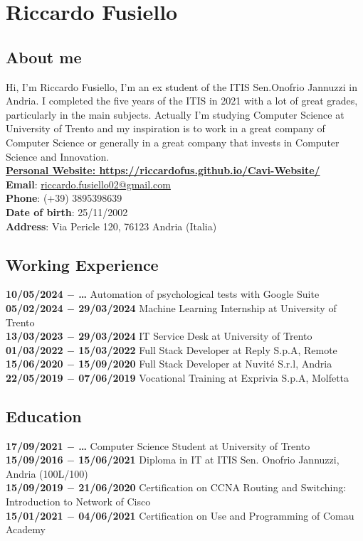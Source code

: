 \documentclass[12pt]{article}
\begin{document}
\section*{Riccardo Fusiello}\subsection*{About me}
Hi, I'm Riccardo Fusiello, I'm an ex student of the ITIS Sen.Onofrio Jannuzzi in Andria. I completed the five years of the ITIS in 2021 with a lot of great grades, particularly in the main subjects. Actually I'm studying Computer Science at University of Trento and my inspiration is to work in a great company of Computer Science or generally in a great company that invests in Computer Science and Innovation.\\
\href{https://riccardofus.github.io/Cavi-Website/}{\textbf{Personal Website: https://riccardofus.github.io/Cavi-Website/}}\\
\textbf{Email}: \href{mailto:riccardo.fusiello02@gmail.com}{riccardo.fusiello02@gmail.com}\\
\textbf{Phone}: (+39) 3895398639\\
\textbf{Date of birth}: 25/11/2002\\
\textbf{Address}: Via Pericle 120, 76123 Andria (Italia)
\subsection*{Working Experience}
\textbf{10/05/2024 $-$ \dots} Automation of psychological tests with Google Suite\\
\textbf{05/02/2024 $-$ 29/03/2024} Machine Learning Internship at University of Trento\\
\textbf{13/03/2023 $-$ 29/03/2024} IT Service Desk at University of Trento\\
\textbf{01/03/2022 $-$ 15/03/2022} Full Stack Developer at Reply S.p.A, Remote\\
\textbf{15/06/2020 $-$ 15/09/2020} Full Stack Developer at Nuvité S.r.l, Andria \\
\textbf{22/05/2019 $-$ 07/06/2019} Vocational Training at Exprivia S.p.A, Molfetta
\subsection*{Education}
\textbf{17/09/2021 $-$ \dots} Computer Science Student at University of Trento\\
\textbf{15/09/2016 $-$ 15/06/2021} Diploma in IT at ITIS Sen. Onofrio Jannuzzi, Andria (100L/100)\\
\textbf{15/09/2019 $-$ 21/06/2020} Certification on CCNA Routing and Switching: Introduction to Network of Cisco\\
\textbf{15/01/2021 $-$ 04/06/2021} Certification on Use and Programming of Comau Academy
\end{document}
